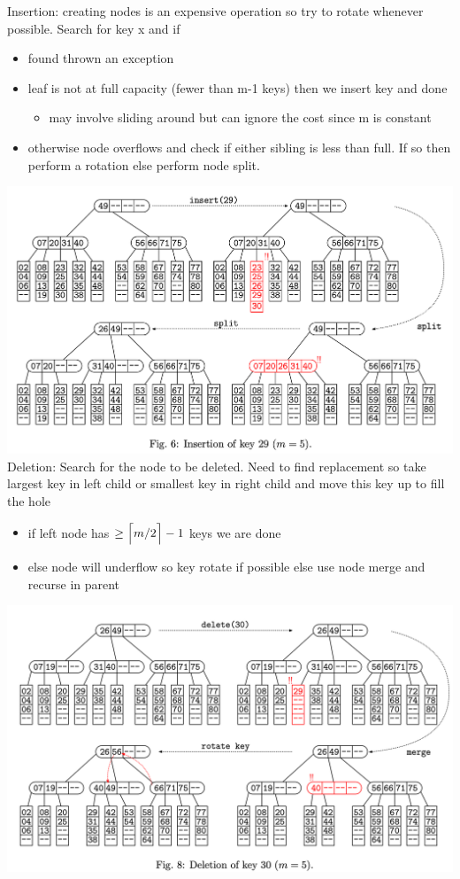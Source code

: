 \documentclass{article}
\DeclarePairedDelimiter{\ceil}{\lceil}{\rceil}
\begin{document}
  Insertion: creating nodes is an expensive operation so try to rotate whenever possible. Search for key x and if
  \begin{itemize}[noitemsep]
  \item found thrown an exception
  \item leaf is not at full capacity (fewer than m-1 keys) then we insert key and done
    \begin{itemize}[noitemsep]
      \item may involve sliding around but can ignore the cost since m is constant
    \end{itemize}
  \item otherwise node overflows and check if either sibling is less than full. If so then perform a rotation else perform node split. 
  \end{itemize}
  \includegraphics[width=\textwidth]{BTreeInsertion}
  \newpage
  Deletion: Search for the node to be deleted. Need to find replacement so take largest key in left child or smallest key in right child and move this key up to fill the hole
  \begin{itemize}[noitemsep]
  \item if left node has $\geq \ceil[\Big]{m/2} - 1$ keys we are done
  \item else node will underflow so key rotate if possible else use node merge and recurse in parent
  \end{itemize}
  \includegraphics[width=\textwidth]{BTreeDeletion}
\end{document}
